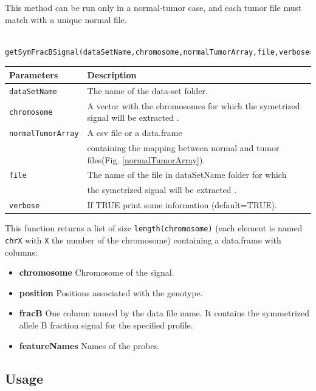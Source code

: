 \documentclass[a4paper,10pt]{article}
\begin{document}
    This method can be run only in a normal-tumor case, and each tumor file must match with a unique normal file.
		
		\begin{verbatim}	
		getSymFracBSignal(dataSetName,chromosome,normalTumorArray,file,verbose=TRUE)
		\end{verbatim}
	
		\begin{center}
			\begin{tabular}{|l|l|}
				\hline
				Parameters & Description\\
				\hline
				\texttt{dataSetName} & The name of the data-set folder.\\
				\texttt{chromosome} & A vector with the chromosomes for which the symetrized signal will be extracted .\\
				\texttt{normalTumorArray} & A csv file or a data.frame \\
				~~ & containing the mapping between normal and tumor files(Fig. \ref{normalTumorArray}).\\
				\texttt{file} & The name of the file in dataSetName folder for which\\
				~ & the symetrized signal will be extracted .\\
				\texttt{verbose} & If TRUE print some information (default=TRUE).\\
				\hline	
			\end{tabular}		
		\end{center}
				
		This function returns a list of size \texttt{length(chromosome)} (each element is named \texttt{chrX} with \texttt{X} the number of the chromosome) containing a data.frame with columns:
		\begin{itemize}
			\item \textbf{chromosome} Chromosome of the signal.
			\item \textbf{position} Positions associated with the genotype.
			\item \textbf{fracB} One column named by the data file name. It contains the symmetrized allele B fraction signal for the specified profile.			
			\item \textbf{featureNames} Names of the probes.
		\end{itemize}
		
		
	\subsection{Usage}
	
\end{document}
